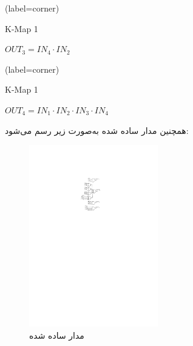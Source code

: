 \begin{enumerate}
	
	
	
	
	
	
	
	\begin{latin}
		\begin{minipage}{0.48\textwidth}
			\centering
			\begin{karnaugh-map}[4][4][1][$IN_2$][$IN_1$][$IN_4$][$IN_3$](label=corner)
			\end{karnaugh-map}
			\caption{K-Map 1}
			$OUT_3=IN_4 \cdot IN_2$
		\end{minipage}
		\hfill
		\begin{minipage}{0.48\textwidth}
			\centering
			\begin{karnaugh-map}[4][4][1][$IN_2$][$IN_1$][$IN_4$][$IN_3$](label=corner)
			\end{karnaugh-map}
			\caption{K-Map 1}
			$OUT_4=IN_1 \cdot IN_2 \cdot IN_3 \cdot IN_4$
		\end{minipage}	
	\end{latin}
	
	همچنین مدار ساده شده به‌صورت زیر رسم می‌شود:
	
	\begin{figure}[h]
		\centering
		\includegraphics[width=0.5\textwidth]{fig/Q3_circ_new.pdf}
		\caption{مدار ساده شده}
		\label{Q3circ}
	\end{figure}
	
	
	
\end{enumerate}

